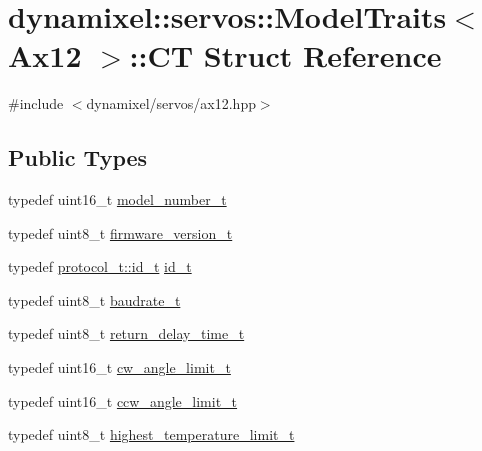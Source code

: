 \hypertarget{structdynamixel_1_1servos_1_1_model_traits_3_01_ax12_01_4_1_1_c_t}{}\section{dynamixel\+:\+:servos\+:\+:Model\+Traits$<$ Ax12 $>$\+:\+:C\+T Struct Reference}
\label{structdynamixel_1_1servos_1_1_model_traits_3_01_ax12_01_4_1_1_c_t}


{\ttfamily \#include $<$dynamixel/servos/ax12.\+hpp$>$}

\subsection*{Public Types}
\begin{DoxyCompactItemize}
\item 
typedef uint16\+\_\+t \hyperlink{structdynamixel_1_1servos_1_1_model_traits_3_01_ax12_01_4_1_1_c_t_af7cc7d1015e115bb5cee55f69160a20b}{model\+\_\+number\+\_\+t}
\item 
typedef uint8\+\_\+t \hyperlink{structdynamixel_1_1servos_1_1_model_traits_3_01_ax12_01_4_1_1_c_t_a081478d3259bb860884584ad45f345f5}{firmware\+\_\+version\+\_\+t}
\item 
typedef \hyperlink{classdynamixel_1_1protocols_1_1_protocol1_a1d4dfa22b01f80b1876d14f539d52b5c}{protocol\+\_\+t\+::id\+\_\+t} \hyperlink{structdynamixel_1_1servos_1_1_model_traits_3_01_ax12_01_4_1_1_c_t_a0c872d4cb05d243b3a1ad358a6b036b4}{id\+\_\+t}
\item 
typedef uint8\+\_\+t \hyperlink{structdynamixel_1_1servos_1_1_model_traits_3_01_ax12_01_4_1_1_c_t_a72a5f288d96c6eceb04aaf15d0006da1}{baudrate\+\_\+t}
\item 
typedef uint8\+\_\+t \hyperlink{structdynamixel_1_1servos_1_1_model_traits_3_01_ax12_01_4_1_1_c_t_a6dca5b5fe3adf16a9fa8ccc9d26a08a6}{return\+\_\+delay\+\_\+time\+\_\+t}
\item 
typedef uint16\+\_\+t \hyperlink{structdynamixel_1_1servos_1_1_model_traits_3_01_ax12_01_4_1_1_c_t_a6f204c4baeeeaa1c8a78b3660db77b93}{cw\+\_\+angle\+\_\+limit\+\_\+t}
\item 
typedef uint16\+\_\+t \hyperlink{structdynamixel_1_1servos_1_1_model_traits_3_01_ax12_01_4_1_1_c_t_a6c07271575b0f9d66e3629b163cc87e3}{ccw\+\_\+angle\+\_\+limit\+\_\+t}
\item 
typedef uint8\+\_\+t \hyperlink{structdynamixel_1_1servos_1_1_model_traits_3_01_ax12_01_4_1_1_c_t_a927ba4cfd2e68533b00e9db76589297e}{highest\+\_\+temperature\+\_\+limit\+\_\+t}

\end{DoxyCompactItemize}
